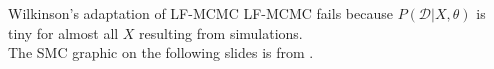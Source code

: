 \documentclass[12pt,a4paper,t,xcolor=dvipsnames,slidestop,compress,mathserif]{beamer}
\begin{document}
\begin{frame}{Wilkinson's adaptation of LF-MCMC}
LF-MCMC fails because $P(\mathcal{D}|X, \theta)$ is tiny for almost all $X$ resulting from simulations.\\
\phantom{0}
The SMC graphic on the following slides is from \cite{FinkeSMCslides}.
\end{frame}

\end{document}
